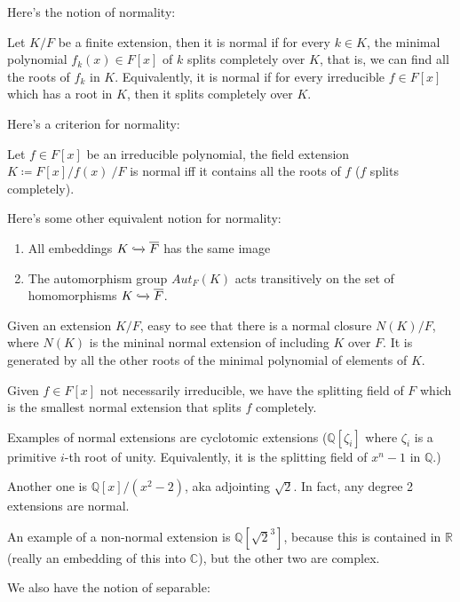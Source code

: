 \documentclass[main.tex]{subfiles}
\begin{document}
Here's the notion of normality:
\begin{definition}
Let $K/F$ be a finite extension, then it is normal if for every $k \in K$, the minimal polynomial $f_k(x) \in F[x]$ of $k$ splits completely over $K$, that is, we can find all the roots of $f_k$ in $K$. Equivalently, it is normal if for every irreducible $f \in F[x]$ which has a root in $K$, then it splits completely over $K$.
\end{definition}

Here's a criterion for normality: 
\begin{lemma}
Let $f \in F[x]$ be an irreducible polynomial, the field extension $K \coloneqq  F[x]/f(x)\ /F $ is normal iff it contains all the roots of $f$ ($f$ splits completely).
\end{lemma}

Here's some other equivalent notion for normality:
\begin{enumerate}
    \item All embeddings $K \xhookrightarrow{} \overline{F}$
    has the same image
    \item The automorphism group $Aut_F(K)$ acts transitively on the set of homomorphisms $K \xhookrightarrow{} \overline{F}$.
\end{enumerate}

Given an extension $K/F$, easy to see that there is a normal closure $N(K)/F$, where $N(K)$ is the mininal normal extension of including $K$ over $F$. It is generated by all the other roots of the minimal polynomial of elements of $K$. 

Given $f \in F[x]$ not necessarily irreducible, we have the splitting field of $F$ which is the smallest normal extension that splits $f$ completely.

\begin{example}
Examples of normal extensions are cyclotomic extensions ($\mathbb{Q}[\zeta_i]$ where $\zeta_i$ is a primitive $i$-th root of unity. Equivalently, it is the splitting field of $x^n -1$ in $\mathbb{Q}$.) 

Another one is $\mathbb{Q}[x]/(x^2 - 2)$, aka adjointing $\sqrt{2}$. In fact, any degree 2 extensions are normal. 

An example of a non-normal extension is $\mathbb{Q}[\sqrt{2}^3]$, because this is contained in $\mathbb{R}$ (really an embedding of this into $\mathbb{C}$), but the other two are complex. 
\end{example}

We also have the notion of separable:
\end{document}
